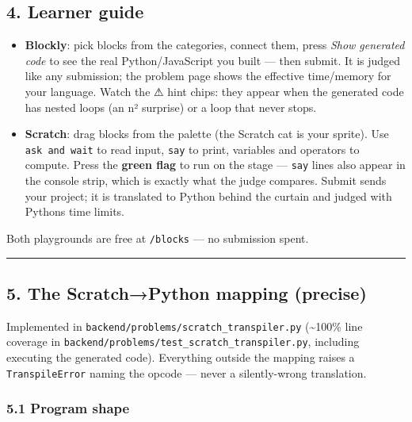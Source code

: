 \documentclass[
]{article}
\providecommand{\tightlist}{%
  \setlength{\itemsep}{0pt}\setlength{\parskip}{0pt}}
\begin{document}
\subsection{4. Learner guide}\label{4-learner-guide}

\begin{itemize}
\tightlist
\item
  \textbf{Blockly}: pick blocks from the categories, connect them, press
  \emph{Show generated code} to see the real Python/JavaScript you built
  --- then submit. It is judged like any submission; the problem page
  shows the effective time/memory for your language. Watch the ⚠ hint
  chips: they appear when the generated code has nested loops (an n²
  surprise) or a loop that never stops.
\item
  \textbf{Scratch}: drag blocks from the palette (the Scratch cat is
  your sprite). Use \texttt{ask\ and\ wait} to read input, \texttt{say}
  to print, variables and operators to compute. Press the \textbf{green
  flag} to run on the stage --- \texttt{say} lines also appear in the
  console strip, which is exactly what the judge compares. Submit sends
  your project; it is translated to Python behind the curtain and judged
  with Python\textquotesingle s time limits.
\end{itemize}

Both playgrounds are free at \texttt{/blocks} --- no submission spent.

\begin{center}\rule{0.5\linewidth}{0.5pt}\end{center}

\subsection{5. The Scratch→Python mapping
(precise)}\label{5-the-scratchpython-mapping-precise}

Implemented in \texttt{backend/problems/scratch\_transpiler.py}
(\textasciitilde100\% line coverage in
\texttt{backend/problems/test\_scratch\_transpiler.py}, including
executing the generated code). Everything outside the mapping raises a
\texttt{TranspileError} naming the opcode --- never a silently-wrong
translation.

\subsubsection{5.1 Program shape}\label{51-program-shape}
\end{document}

